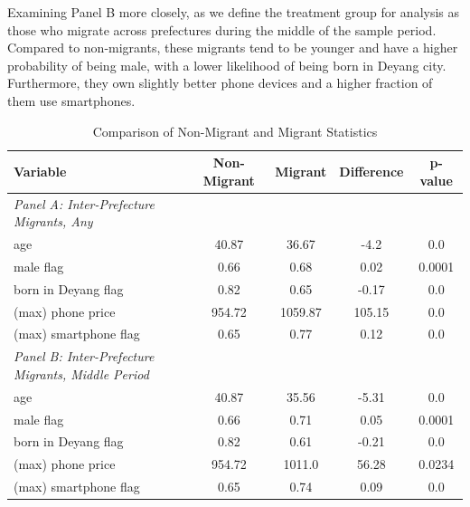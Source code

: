 
Examining Panel B more closely, as we define the treatment group for analysis as those who migrate across prefectures during the middle of the sample period.
Compared to non-migrants, these migrants tend to be younger and have a higher probability of being male, with a lower likelihood of being born in Deyang city.
Furthermore, they own slightly better phone devices and a higher fraction of them use smartphones.

\begin{table}[htbp]
\vspace{0.2cm}
\renewcommand{\arraystretch}{1.6}
\setlength{\tabcolsep}{1mm}{}
\centering
\small
\caption{Comparison of Non-Migrant and Migrant Statistics}

\begin{tabular}{lcccc} \hline
Variable & Non-Migrant & Migrant & Difference & p-value \\ \hline
\textit{Panel A: Inter-Prefecture Migrants, Any} \\
age & 40.87 & 36.67 & -4.2 & 0.0 \\
male flag & 0.66 & 0.68 & 0.02 & 0.0001 \\
born in Deyang flag & 0.82 & 0.65 & -0.17 & 0.0 \\
(max) phone price & 954.72 & 1059.87 & 105.15 & 0.0 \\
(max) smartphone flag & 0.65 & 0.77 & 0.12 & 0.0 \\ \hline

\textit{Panel B: Inter-Prefecture Migrants, Middle Period} \\
age & 40.87 & 35.56 & -5.31 & 0.0 \\
male flag & 0.66 & 0.71 & 0.05 & 0.0001 \\
born in Deyang flag & 0.82 & 0.61 & -0.21 & 0.0 \\
(max) phone price & 954.72 & 1011.0 & 56.28 & 0.0234 \\
(max) smartphone flag & 0.65 & 0.74 & 0.09 & 0.0 \\ \hline

\end{tabular}

\label{tab:non_migrant_migrant_comparison}%
\end{table}%

